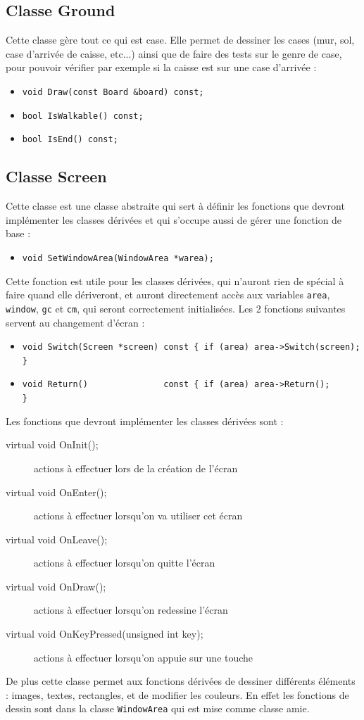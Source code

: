 \documentclass[a4paper,11pt,oneside]{article}
\begin{document}
\subsection{Classe Ground}
Cette classe gère tout ce qui est case. Elle permet de dessiner les cases (mur, sol, case d'arrivée de caisse, etc...) ainsi que de faire
des tests sur le genre de case, pour pouvoir vérifier par exemple si la caisse est sur une case d'arrivée :
\begin{itemize}
\item\verb|void Draw(const Board &board) const;|
\item\verb|bool IsWalkable() const;|
\item\verb|bool IsEnd() const;|
\end{itemize}

\subsection{Classe Screen}
Cette classe est une classe abstraite qui sert à définir les fonctions que devront implémenter les classes dérivées et qui
s'occupe aussi de gérer une fonction de base :
\begin{itemize}
\item\verb|void SetWindowArea(WindowArea *warea);|
\end{itemize}
Cette fonction est utile pour les classes dérivées, qui n'auront rien de spécial à faire quand elle dériveront,
et auront directement accès aux variables \verb|area|, \verb|window|, \verb|gc| et \verb|cm|, qui seront correctement initialisées.
Les 2 fonctions suivantes servent au changement d'écran :
\begin{itemize}
\item\verb|void Switch(Screen *screen) const { if (area) area->Switch(screen); }|
\item\verb|void Return()               const { if (area) area->Return();       }|
\end{itemize}
Les fonctions que devront implémenter les classes dérivées sont :
\begin{description}
	\item[virtual void OnInit();] actions à effectuer lors de la création de l'écran
	\item[virtual void OnEnter();] actions à effectuer lorsqu'on va utiliser cet écran
	\item[virtual void OnLeave();] actions à effectuer lorsqu'on quitte l'écran
	\item[virtual void OnDraw();] actions à effectuer lorsqu'on redessine l'écran
	\item[virtual void OnKeyPressed(unsigned int key);] actions à effectuer lorsqu'on appuie sur une touche
\end{description}
De plus cette classe permet aux fonctions dérivées de dessiner différents éléments : images, textes, rectangles, et de modifier les couleurs.
En effet les fonctions de dessin sont dans la classe \verb|WindowArea| qui est mise comme classe amie.
\end{document}
